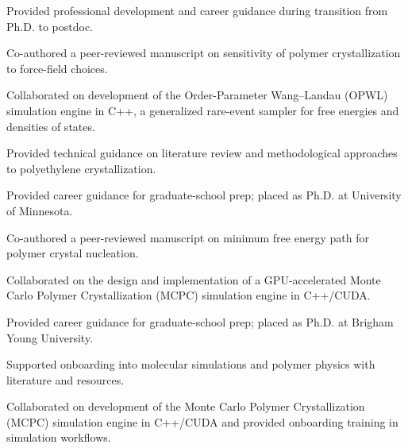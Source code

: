 \documentclass[letterpaper,11pt]{article}
\begin{document}
\begin{menteeitems}
  \item Provided professional development and career guidance during transition from Ph.D. to postdoc.
\end{menteeitems}


\begin{menteeitems}
  \item Co-authored a peer-reviewed manuscript on sensitivity of polymer crystallization to force-field choices.
  \item Collaborated on development of the Order-Parameter Wang--Landau (OPWL) simulation engine in C++, a generalized rare-event sampler for free energies and densities of states.
  \item Provided technical guidance on literature review and methodological approaches to polyethylene crystallization.
  \item Provided career guidance for graduate-school prep; placed as Ph.D. at University of Minnesota.
\end{menteeitems}

\begin{menteeitems}
  \item Co-authored a peer-reviewed manuscript on minimum free energy path for polymer crystal nucleation.
  \item Collaborated on the design and implementation of a GPU-accelerated Monte Carlo Polymer Crystallization (MCPC) simulation engine in C++/CUDA.
  \item Provided career guidance for graduate-school prep; placed as Ph.D. at Brigham Young University.
\end{menteeitems}

\begin{menteeitems}
  \item Supported onboarding into molecular simulations and polymer physics with literature and resources.
\end{menteeitems}

\begin{menteeitems}
  \item Collaborated on development of the Monte Carlo Polymer Crystallization (MCPC) simulation engine in C++/\allowbreak{}CUDA and provided onboarding training in simulation workflows.
\end{menteeitems}
\end{document}
